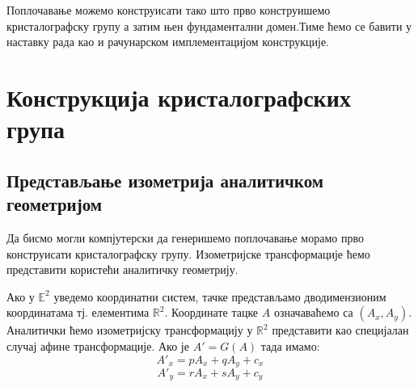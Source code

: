 \documentclass[12pt]{article}
\newtheorem{definition}[theorem]{\bf Дефиниција}
\begin{document}
Поплочавање можемо конструисати тако што прво конструишемо кристалографску групу а затим њен фундаментални домен.Тиме ћемо се бавити у наставку рада као и рачунарском имплементацијом конструкције.






    \section{\texorpdfstring{Конструкција кристалографских група
}{Izometrijske transformacije u \textbackslash{}mathbb\{Е\}\^{}2}}\label{izometrijske-transformacije-u-mathbbr2}
\subsection{Представљање изометрија аналитичком геометријом}

Да бисмо могли компјутерски да генеришемо поплочавање морамо прво конструисати кристалографску групу. Изометријске трансформације ћемо представити користећи аналитичку геометрију.




    Ако у \(\mathbb{E}^2\) уведемо координатни систем, тачке представљамо
дводимензионим координатама тј. елементима \(\mathbb{R}^2\). Координате
тацке \(A\) означаваћемо са \((A_x, A_y)\). Аналитички ћемо изометријску
трансформацију у \(\mathbb{R}^2\) представити као специјалан случај
афине трансформације. Ако је \(A' = G(A)\) тада имамо:
\[A'_x = pA_x + qA_y + c_x\] \[A'_y = rA_x + sA_y + c_y\] 
\end{document}
